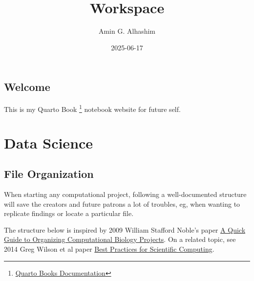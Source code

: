 \documentclass[
  letterpaper,
  DIV=11,
  numbers=noendperiod]{scrreprt}
\title{Workspace}
\author{Amin G. Alhashim}
\date{2025-06-17}
\renewcommand*\contentsname{Table of contents}
\newcommand\contentsname{Table of contents}
\begin{document}
\maketitle

\renewcommand*\contentsname{Table of contents}
{
\hypersetup{linkcolor=}
\setcounter{tocdepth}{2}
\tableofcontents
}


\chapter*{Welcome}\label{welcome}


This is my Quarto Book \footnote{\href{https://quarto.org/docs/books/}{Quarto
  Books Documentation}} notebook website for future self.

\part{Data Science}

\chapter{File Organization}\label{file-organization}

When starting any computational project, following a well-documented
structure will save the creators and future patrons a lot of troubles,
eg, when wanting to replicate findings or locate a particular file.

The structure below is inspired by 2009 William Stafford Noble's paper
\href{https://journals.plos.org/ploscompbiol/article?id=10.1371/journal.pcbi.1000424}{A
Quick Guide to Organizing Computational Biology Projects}. On a related
topic, see 2014 Greg Wilson et al paper
\href{https://journals.plos.org/plosbiology/article?id=10.1371/journal.pbio.1001745}{Best
Practices for Scientific Computing}.
\end{document}
